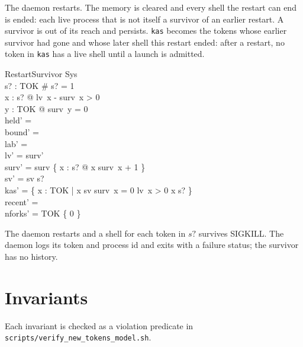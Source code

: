 \documentclass[a4paper,10pt,fleqn]{article}
\begin{document}
The daemon restarts. The memory is cleared and every shell the restart can end is ended: each live process that is not itself a survivor of an earlier restart. A survivor is out of its reach and persists. \texttt{kas} becomes the tokens whose earlier survivor had gone and whose later shell this restart ended: after a restart, no token in \texttt{kas} has a live shell until a launch is admitted.

\begin{schema}{RestartSurvivor}
  \Delta Sys \\
  s? : \power TOK
\where
  \# s? = 1 \\
  \forall x : s? @ lv~x - surv~x > 0 \\
  \forall y : TOK @ surv~y = 0 \\
  held' = \emptyset \\
  bound' = \emptyset \\
  lab' = \emptyset \\
  lv' = surv' \\
  surv' = surv \oplus \{ x : s? @ x \mapsto surv~x + 1 \} \\
  sv' = sv \cup s? \\
  kas' = \{ x : TOK | x \in sv \land surv~x = 0 \land lv~x > 0 \land x \notin s? \} \\
  recent' = \langle \rangle \\
  nforks' = TOK \cross \{ 0 \}
\end{schema}

The daemon restarts and a shell for each token in $s?$ survives SIGKILL. The daemon logs its token and process id and exits with a failure status; the survivor has no history.

\section{Invariants}

Each invariant is checked as a violation predicate in
\texttt{scripts/verify\_new\_tokens\_model.sh}.
\end{document}

